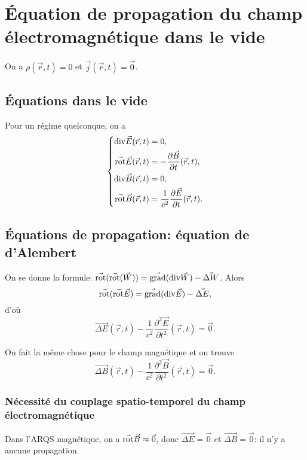 \section{Équation de propagation du champ électromagnétique dans le vide}

On a $\rho(\vec{r},t)=0$ et $\vec{j}(\vec{r},t)=\vec{0}$.

\subsection{Équations dans le vide}

Pour un régime quelconque, on a 
\begin{equation}
    \left\lbrace
        \begin{aligned}
            \mathrm{div}\vec{E}(\vec{r},t)&=0,\\
            \vec{\mathrm{rot}}\vec{E}(\vec{r},t)&=-\frac{\partial\vec{B}}{\partial t}(\vec{r},t),\\
            \mathrm{div}\vec{B}(\vec{r},t)&=0,\\
            \vec{\mathrm{rot}}\vec{B}(\vec{r},t)&=\frac{1}{c^{2}}\frac{\partial\vec{E}}{\partial t}(\vec{r},t).
        \end{aligned}
    \right.
\end{equation}

\subsection{Équations de propagation: équation de d'Alembert}

On se donne la formule: $\vec{\mathrm{rot}}(\vec{\mathrm{rot}}(\vec{W}))=\vec{\mathrm{grad}}(\mathrm{div}\vec{W})-\vec{\Delta W}$. Alors
\begin{equation}
    \vec{\mathrm{rot}}(\vec{\mathrm{rot}}\vec{E})=\vec{\mathrm{grad}}(\mathrm{div}\vec{E})-\vec{\Delta E},
\end{equation}
d'où
\begin{equation}
    \boxed{
        \vec{\Delta E}(\vec{r},t)-\frac{1}{c^{2}}\frac{\partial^{2}\vec{E}}{\partial t^{2}}(\vec{r},t)=\vec{0}.
    }
\end{equation}

On fait la même chose pour le champ magnétique et on trouve
\begin{equation}
    \boxed{
        \vec{\Delta B}(\vec{r},t)-\frac{1}{c^{2}}\frac{\partial^{2}\vec{B}}{\partial t^{2}}(\vec{r},t)=\vec{0}.
    }
\end{equation}

\subsubsection{Nécessité du couplage spatio-temporel du champ électromagnétique}

Dans l'ARQS magnétique, on a $\vec{\mathrm{rot}}\vec{B}\approx\vec{0}$, donc $\vec{\Delta E}=\vec{0}$ et $\vec{\Delta B}=\vec{0}$: il n'y a aucune propagation.